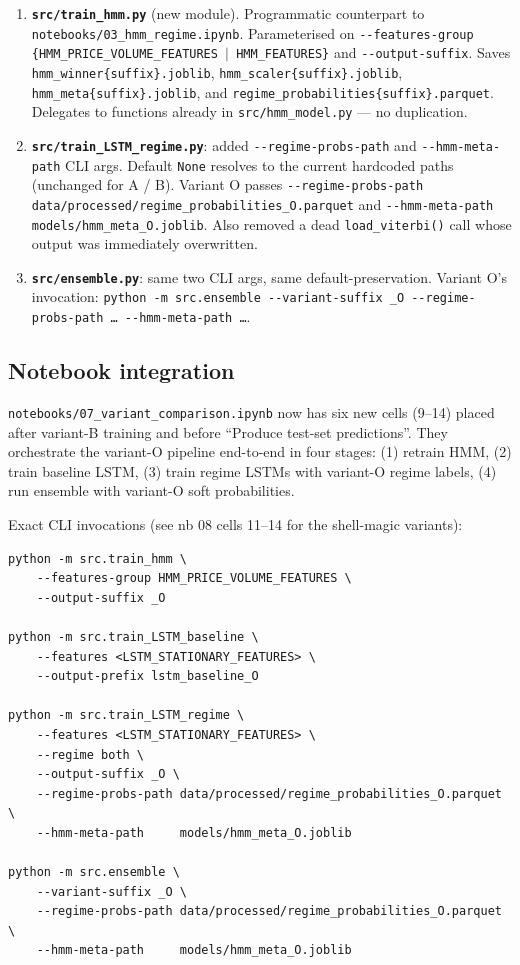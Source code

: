 \documentclass[11pt]{article}
\begin{document}
\begin{enumerate}[leftmargin=*]
  \item \textbf{\texttt{src/train\_hmm.py}} (new module). Programmatic counterpart to \texttt{notebooks/03\_hmm\_regime.ipynb}. Parameterised on \texttt{-{}-features-group \{HMM\_PRICE\_VOLUME\_FEATURES $|$ HMM\_FEATURES\}} and \texttt{-{}-output-suffix}. Saves \texttt{hmm\_winner\{suffix\}.joblib}, \texttt{hmm\_scaler\{suffix\}.joblib}, \texttt{hmm\_meta\{suffix\}.joblib}, and \texttt{regime\_probabilities\{suffix\}.parquet}. Delegates to functions already in \texttt{src/hmm\_model.py} --- no duplication.
  \item \textbf{\texttt{src/train\_LSTM\_regime.py}}: added \texttt{-{}-regime-probs-path} and \texttt{-{}-hmm-meta-path} CLI args. Default \texttt{None} resolves to the current hardcoded paths (unchanged for A / B). Variant O passes \texttt{-{}-regime-probs-path data/processed/\allowbreak regime\_probabilities\_O.parquet} and \texttt{-{}-hmm-meta-path models/hmm\_meta\_O.joblib}. Also removed a dead \texttt{load\_viterbi()} call whose output was immediately overwritten.
  \item \textbf{\texttt{src/ensemble.py}}: same two CLI args, same default-preservation. Variant O's invocation: \texttt{python -m src.ensemble -{}-variant-suffix \_O -{}-regime-probs-path \ldots\ -{}-hmm-meta-path \ldots}.
\end{enumerate}

\subsection*{Notebook integration}

\texttt{notebooks/07\_variant\_comparison.ipynb} now has six new cells (9--14) placed after variant-B training and before ``Produce test-set predictions''. They orchestrate the variant-O pipeline end-to-end in four stages: (1) retrain HMM, (2) train baseline LSTM, (3) train regime LSTMs with variant-O regime labels, (4) run ensemble with variant-O soft probabilities.

Exact CLI invocations (see nb 08 cells 11--14 for the shell-magic variants):
\begin{small}
\begin{verbatim}
python -m src.train_hmm \
    --features-group HMM_PRICE_VOLUME_FEATURES \
    --output-suffix _O

python -m src.train_LSTM_baseline \
    --features <LSTM_STATIONARY_FEATURES> \
    --output-prefix lstm_baseline_O

python -m src.train_LSTM_regime \
    --features <LSTM_STATIONARY_FEATURES> \
    --regime both \
    --output-suffix _O \
    --regime-probs-path data/processed/regime_probabilities_O.parquet \
    --hmm-meta-path     models/hmm_meta_O.joblib

python -m src.ensemble \
    --variant-suffix _O \
    --regime-probs-path data/processed/regime_probabilities_O.parquet \
    --hmm-meta-path     models/hmm_meta_O.joblib
\end{verbatim}
\end{small}
\end{document}
